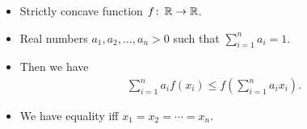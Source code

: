 \begin{frame}
  \begin{theorem}
    \begin{itemize}
      \item Strictly concave function \(f\colon \operatorname{\mathbb{R}}\to \operatorname{\mathbb{R}}\).
      \item Real numbers \(a_1, a_2,\ldots, a_n > 0\) such that \(\sum_{i=1}^n 
          a_i = 1\).
      \item Then we have
        \begin{align*}
          \sum_{i=1}^n a_i f(x_i) \leq f\left( \sum_{i=1}^n a_i x_i\right).
        \end{align*}
      \item We have equality iff \(x_1 = x_2 = \cdots = x_n\).
    \end{itemize}
  \end{theorem}
\end{frame}

%
%
%

